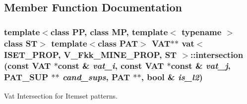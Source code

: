 \subsection{Member Function Documentation}
\subsubsection{\setlength{\rightskip}{0pt plus 5cm}template$<$class PP, class MP, template$<$ typename $>$ class ST$>$ template$<$class PAT$>$ {\bf VAT}$\ast$$\ast$ {\bf vat}$<$ ISET\_\-PROP, V\_\-Fkk\_\-MINE\_\-PROP, ST $>$::intersection (const {\bf VAT} $\ast$const \& {\em vat\_\-i}, const {\bf VAT} $\ast$const \& {\em vat\_\-j}, {\bf PAT\_\-SUP} $\ast$$\ast$ {\em cand\_\-sups}, PAT $\ast$$\ast$, bool \& {\em is\_\-l2})\hspace{0.3cm}{\tt  [inline, static]}}\label{classvat_3_01ISET__PROP_00_01V__Fkk__MINE__PROP_00_01ST_01_4_e0}


Vat Intersection for Itemset patterns. 

